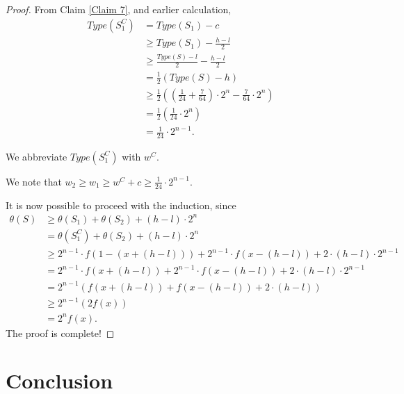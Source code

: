 \documentclass[12pt]{ucthesis}
\theoremstyle{plain}
\theoremstyle{definition}
\begin{document}
\begin{proof}
From Claim \ref{Claim 7}, and earlier calculation,
\begin{align*}
Type(S_1^C)
& = Type(S_1) - c \\
& \ge Type(S_1) - \frac{h - l}{2} \\
& \ge \frac{Type(S) - l}{2} - \frac{h - l}{2} \\
& = \frac{1}{2} (Type(S) - h) \\
& \ge \frac{1}{2} ((\frac{1}{24} + \frac{7}{64}) \cdot 2^n - \frac{7}{64} \cdot 2^n) \\
& = \frac{1}{2} (\frac{1}{24} \cdot 2^n) \\
& = \frac{1}{24} \cdot 2^{n - 1}.
\end{align*}

We abbreviate $Type(S_1^C)$ with $w^C$.

We note that $w_2 \ge w_1 \ge w^C + c \ge \frac{1}{24} \cdot 2^{n - 1}$.

It is now possible to proceed with the induction, since
\begin{align*}
\theta(S)
& \ge \theta(S_1) + \theta(S_2) + (h - l) \cdot 2^n \\
& = \theta(S_1^C) + \theta(S_2) + (h - l) \cdot 2^n \\
& \ge 2^{n - 1} \cdot f(1 - (x + (h - l))) +
      2^{n - 1} \cdot f(x - (h - l)) + 2 \cdot (h - l) \cdot 2^{n - 1} \\
& = 2^{n - 1} \cdot f(x + (h - l)) + 2^{n - 1} \cdot f(x - (h - l)) +
    2 \cdot (h - l) \cdot 2^{n - 1} \\
& = 2^{n - 1} (f(x + (h - l)) + f(x - (h - l)) + 2 \cdot (h - l)) \\
& \ge 2^{n - 1} (2 f(x)) \\
& = 2^n f(x).
\end{align*}
The proof is complete!
\end{proof}

\chapter{Conclusion}
\label{Chapter 5}
\end{document}
